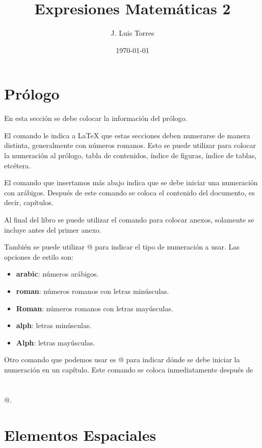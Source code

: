 \documentclass[letterpaper,12pt]{book}
\title{Expresiones Matemáticas 2}
\author{J. Luis Torres}
\date{\today}
\begin{document}
\maketitle
\frontmatter
\tableofcontents
\listoftables

\chapter{Prólogo}

En esta sección se debe colocar la información del prólogo.

El comando \verb@\frontmatter@ le indica a \LaTeX{} que estas secciones deben numerarse de manera distinta,
generalmente con números romanos. Esto se puede utilizar para colocar la numeración al prólogo, 
tabla de contenidos, índice de figuras, índice de tablas, etcétera.

El comando \verb@\mainmatter@ que insertamos más abajo indica que se debe iniciar una 
numeración con arábigos. Después de este comando se coloca el contenido del documento, es decir, capítulos.

Al final del libro se puede utilizar el comando \verb@\appendix@ para colocar anexos, solamente se incluye antes del primer anexo. 

También se puede utilizar \verb@{}@ para indicar el tipo de numeración a usar. Las opciones
de estilo son: 

\begin{itemize}
	\item \textbf{arabic}: números arábigos. 
	\item \textbf{roman}: números romanos con letras minúsculas. 
	\item \textbf{Roman}: números romanos con letras mayúsculas.
	\item \textbf{alph}: letras minúsculas. 
	\item \textbf{Alph}: letras mayúsculas.
\end{itemize}

Otro comando que podemos usar es \verb@\setcounter{page}{número}@ para indicar dónde se debe iniciar la numeración
en un capítulo. Este comando se coloca inmediatamente después de \verb@\chapter{}@.

\mainmatter

\chapter{Elementos Espaciales}
\setcounter{page}{3} %
\end{document}
